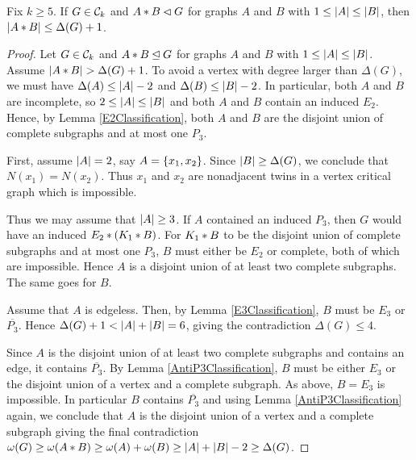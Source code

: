 \begin{lem}\label{JoinSize}
Fix $k \geq 5$.  If $G \in \mathcal{C}_{k}$ and $A \mbox{\hspace{2 pt}$\ast$\hspace{2 pt}} B \lhd G$ for graphs $A$ and $B$ with $1 \leq \left|A\right| \leq \left|B\right|$, then $\left|A \mbox{\hspace{2 pt}$\ast$\hspace{2 pt}} B\right| \leq \Delta(G) + 1$.
\end{lem}
\begin{proof}
Let $G \in \mathcal{C}_{k}$ and $A \mbox{\hspace{2 pt}$\ast$\hspace{2 pt}} B \unlhd G$ for graphs $A$ and $B$ with $1 \leq
\left|A\right| \leq \left|B\right|$. Assume $\left|A \mbox{\hspace{2 pt}$\ast$\hspace{2 pt}} B\right| > \Delta(G) + 1$.  To avoid
a vertex with degree larger than $\Delta(G)$, we must have $\Delta(A) \leq
\left|A\right| - 2$ and $\Delta(B) \leq \left|B\right| - 2$.  In particular, both $A$ and
$B$ are incomplete, so $2 \leq \left|A\right| \leq \left|B\right|$ and both $A$ and $B$ contain an induced $E_2$.  Hence, by Lemma \ref{E2Classification}, both $A$ and $B$ are the disjoint union of complete subgraphs and at most one $P_3$.

First, assume $\left|A\right| = 2$, say $A = \left\{ x_1, x_2 \right\}$.  Since $\left|B\right| \geq \Delta(G)$, we conclude that $N(x_1) = N(x_2)$.  Thus $x_1$ and $x_2$ are nonadjacent twins in a vertex critical graph which is impossible.

Thus we may assume that $\left|A\right| \geq 3$.   If $A$ contained an induced $P_3$, then $G$ would have an induced $E_2 \mbox{\hspace{2 pt}$\ast$\hspace{2 pt}} (K_1 \mbox{\hspace{2 pt}$\ast$\hspace{2 pt}} B)$.  For $K_1 \mbox{\hspace{2 pt}$\ast$\hspace{2 pt}} B$ to be the disjoint union of complete subgraphs and at most one $P_3$, $B$ must either be $E_2$ or complete, both of which are impossible.  Hence $A$ is a disjoint union of at least two complete subgraphs.  The same goes for $B$.

Assume that $A$ is edgeless.  Then, by Lemma \ref{E3Classification}, $B$ must be $E_3$ or $\overline{P_3}$.  Hence $\Delta(G) + 1 < \left|A\right| + \left|B\right| = 6$, giving the contradiction $\Delta(G) \leq 4$.

Since $A$ is the disjoint union of at least two  complete subgraphs and contains an edge, it contains $\overline{P_3}$.  By Lemma \ref{AntiP3Classification}, $B$ must be either $E_3$ or the disjoint union of a vertex and a complete subgraph.  As above, $B = E_3$ is impossible.  In particular $B$ contains $\overline{P_3}$ and using Lemma \ref{AntiP3Classification} again, we conclude that $A$ is the disjoint union of a vertex and a complete subgraph giving the final contradiction $\omega(G) \geq \omega(A \mbox{\hspace{2 pt}$\ast$\hspace{2 pt}} B) \geq \omega(A) + \omega(B) \geq \left|A\right| + \left|B\right| - 2 \geq \Delta(G)$.
\end{proof}

